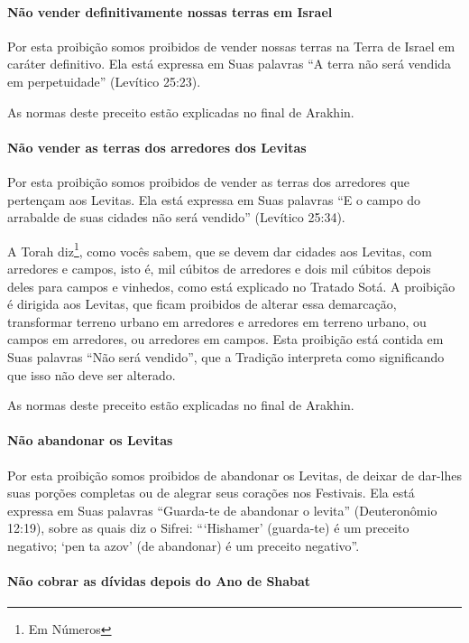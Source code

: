 \paragraph{Não vender definitivamente nossas terras em Israel}

Por esta proibição somos proibidos de vender nossas terras na Terra de
Israel em caráter definitivo. Ela está expressa em Suas palavras ``A
terra não será vendida em perpetuidade'' (Levítico 25:23).

As normas deste preceito estão explicadas no final de Arakhin.

\paragraph{Não vender as terras dos arredores dos Levitas}

Por esta proibição somos proibidos de vender as terras dos arredores
que pertençam aos Levitas. Ela está expressa em Suas palavras ``E o
campo do arrabalde de suas cidades não será vendido'' (Levítico 25:34).

A Torah diz\footnote{Em Números}, como vocês sabem, que se devem dar
cidades aos Levitas, com arredores e campos, isto é, mil cúbitos de
arredores e dois mil cúbitos depois deles para campos e vinhedos, como
está explicado no Tratado Sotá. A proibição é dirigida aos Levitas, que
ficam proibidos de alterar essa demarcação, transformar terreno urbano
em arredores e arredores em terreno urbano, ou campos em arredores, ou
arredores em campos. Esta proibição está contida em Suas palavras ``Não
será vendido'', que a Tradição interpreta como significando que isso não
deve ser alterado.

As normas deste preceito estão explicadas no final de Arakhin.

\paragraph{Não abandonar os Levitas}

Por esta proibição somos proibidos de abandonar os Levitas, de deixar
de dar-lhes suas porções completas ou de alegrar seus corações nos
Festivais. Ela está expressa em Suas palavras ``Guarda-te de abandonar
o levita'' (Deuteronômio 12:19), sobre as quais diz o Sifrei:
```Hishamer' (guarda-te) é um preceito negativo; `pen ta azov' (de
abandonar) é um preceito negativo''.

\paragraph{Não cobrar as dívidas depois do Ano de Shabat}

